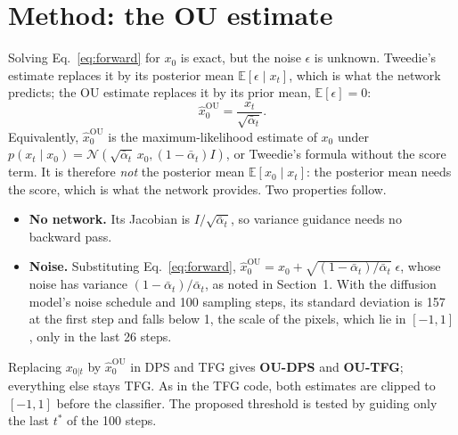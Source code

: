 \documentclass[11pt]{article}
\newcommand{\E}{\mathbb{E}}
\newcommand{\N}{\mathcal{N}}
\newcommand{\xou}{\hat x_0^{\mathrm{OU}}}
\begin{document}
\section{Method: the OU estimate}
Solving Eq.~\eqref{eq:forward} for $x_0$ is exact, but the noise $\epsilon$ is unknown. Tweedie's estimate replaces
it by its posterior mean $\E[\epsilon \mid x_t]$, which is what the network predicts; the OU estimate replaces it by
its prior mean, $\E[\epsilon] = 0$:
\begin{equation}\label{eq:ou}
  \xou = \frac{x_t}{\sqrt{\bar\alpha_t}}.
\end{equation}
Equivalently, $\xou$ is the maximum-likelihood estimate of $x_0$ under
$p(x_t \mid x_0) = \N(\sqrt{\bar\alpha_t}\,x_0, (1-\bar\alpha_t)I)$, or Tweedie's formula without the score term. It
is therefore \emph{not} the posterior mean $\E[x_0 \mid x_t]$: the posterior mean needs the score, which is what the
network provides. Two properties follow.
\begin{itemize}
  \item \textbf{No network.} Its Jacobian is $I/\sqrt{\bar\alpha_t}$, so variance guidance needs no backward pass.
  \item \textbf{Noise.} Substituting Eq.~\eqref{eq:forward},
        $\xou = x_0 + \sqrt{(1-\bar\alpha_t)/\bar\alpha_t}\;\epsilon$, whose noise has variance
        $(1-\bar\alpha_t)/\bar\alpha_t$, as noted in Section~1. With the diffusion model's noise schedule and 100 sampling
        steps, its standard deviation is 157 at the first step and falls below 1, the scale of the pixels, which lie in
        $[-1, 1]$, only in the last 26 steps.
\end{itemize}
Replacing $x_{0|t}$ by $\xou$ in DPS and TFG gives \textbf{OU-DPS} and \textbf{OU-TFG}; everything else stays TFG.
As in the TFG code, both estimates are clipped to $[-1, 1]$ before the classifier. The proposed threshold is tested by
guiding only the last $t^*$ of the 100 steps.
\end{document}
